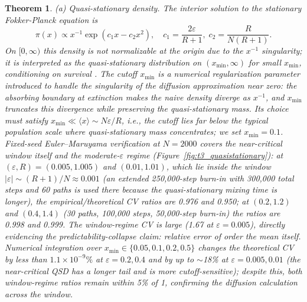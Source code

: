 \documentclass[review]{elsarticle}
\theoremstyle{plain}
\newtheorem{theorem}{Theorem}
\theoremstyle{definition}
\begin{document}
\begin{theorem}
(a) Quasi-stationary density. The interior solution to the stationary Fokker-Planck equation is
\begin{equation}
\pi(x) \propto x^{-1} \exp\left(c_1 x - c_2 x^2\right), \quad c_1 = \frac{2\varepsilon}{R+1}, \; c_2 = \frac{R}{N(R+1)}.
\end{equation}
On $[0,\infty)$ this density is not normalizable at the origin due to the $x^{-1}$ singularity; it is interpreted as the quasi-stationary distribution on $(x_{\min}, \infty)$ for small $x_{\min}$, conditioning on survival \citep{nassel2001extinction}. The cutoff $x_{\min}$ is a numerical regularization parameter introduced to handle the singularity of the diffusion approximation near zero: the absorbing boundary at extinction makes the naive density diverge as $x^{-1}$, and $x_{\min}$ truncates this divergence while preserving the quasi-stationary mass. Its choice must satisfy $x_{\min} \ll \langle x \rangle \sim N \varepsilon/R$, i.e., the cutoff lies far below the typical population scale where quasi-stationary mass concentrates; we set $x_{\min}=0.1$. Fixed-seed Euler--Maruyama verification at $N=2000$ covers the near-critical window itself and the moderate-$\varepsilon$ regime (Figure~\ref{fig:t3_quasistationary}): at $(\varepsilon,R)=(0.005,1.005)$ and $(0.01,1.01)$, which lie inside the window $|\varepsilon| \sim (R+1)/N \approx 0.001$ (an extended 250,000-step burn-in with 300,000 total steps and 60 paths is used there because the quasi-stationary mixing time is longer), the empirical/theoretical CV ratios are 0.976 and 0.950; at $(0.2,1.2)$ and $(0.4,1.4)$ (30 paths, 100,000 steps, 50,000-step burn-in) the ratios are 0.998 and 0.999. The window-regime CV is large (1.67 at $\varepsilon=0.005$), directly evidencing the predictability-collapse claim: relative error of order the mean itself. Numerical integration over $x_{\min}\in\{0.05,0.1,0.2,0.5\}$ changes the theoretical CV by less than $1.1\times10^{-9}\%$ at $\varepsilon=0.2,0.4$ and by up to $\sim$18\% at $\varepsilon=0.005,0.01$ (the near-critical QSD has a longer tail and is more cutoff-sensitive); despite this, both window-regime ratios remain within 5\% of 1, confirming the diffusion calculation across the window.


\end{theorem}
\end{document}
